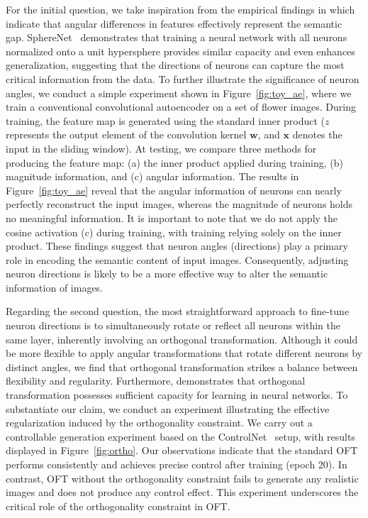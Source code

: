 For the initial question, we take inspiration from the empirical findings in \cite{liu2018decoupled,chen2020angular} which indicate that angular differences in features effectively represent the semantic gap. SphereNet~\cite{liu2017deep} demonstrates that training a neural network with all neurons normalized onto a unit hypersphere provides similar capacity and even enhances generalization, suggesting that the directions of neurons can capture the most critical information from the data. To further illustrate the significance of neuron angles, we conduct a simple experiment shown in Figure~\ref{fig:toy_ae}, where we train a conventional convolutional autoencoder on a set of flower images. During training, the feature map is generated using the standard inner product ($z$ represents the output element of the convolution kernel $\bm{w}$, and $\bm{x}$ denotes the input in the sliding window). At testing, we compare three methods for producing the feature map: (a) the inner product applied during training, (b) magnitude information, and (c) angular information. The results in Figure~\ref{fig:toy_ae} reveal that the angular information of neurons can nearly perfectly reconstruct the input images, whereas the magnitude of neurons holds no meaningful information. It is important to note that we do not apply the cosine activation (c) during training, with training relying solely on the inner product. These findings suggest that neuron angles (directions) play a primary role in encoding the semantic content of input images. Consequently, adjusting neuron directions is likely to be a more effective way to alter the semantic information of images.

Regarding the second question, the most straightforward approach to fine-tune neuron directions is to simultaneously rotate or reflect all neurons within the same layer, inherently involving an orthogonal transformation. Although it could be more flexible to apply angular transformations that rotate different neurons by distinct angles, we find that orthogonal transformation strikes a balance between flexibility and regularity. Furthermore, \cite{liu2021orthogonal} demonstrates that orthogonal transformation possesses sufficient capacity for learning in neural networks. To substantiate our claim, we conduct an experiment illustrating the effective regularization induced by the orthogonality constraint. We carry out a controllable generation experiment based on the ControlNet~\cite{zhang2023adding} setup, with results displayed in Figure~\ref{fig:ortho}. Our observations indicate that the standard OFT performs consistently and achieves precise control after training (epoch 20). In contrast, OFT without the orthogonality constraint fails to generate any realistic images and does not produce any control effect. This experiment underscores the critical role of the orthogonality constraint in OFT.

